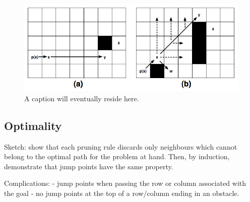 \begin{figure}[tb]
       \begin{center}
		   \includegraphics[scale=0.35, trim = 10mm 10mm 10mm 0mm]
			{diagrams/jumppoints.png}
       \end{center}
	\vspace{-3pt}
       \caption{A caption will eventually reside here.}
       \label{fig:jumppoints}
\end{figure}

\subsection{Optimality}

Sketch: show that each pruning rule discards only neighbours
which cannot belong to the optimal path for the problem at hand.
Then, by induction, demonstrate that jump points have the same 
property. 

Complications:
 - jump points when passing the row or column associated with the goal
 - no jump points at the top of a row/column ending in an obstacle.

